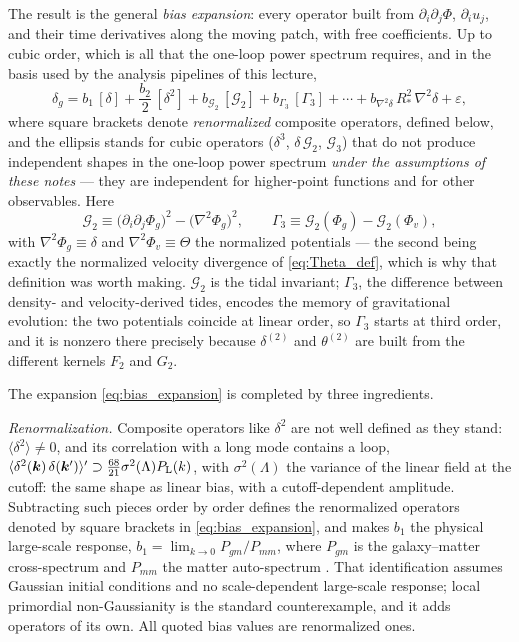 \documentclass[a4paper,11pt]{article}
\newcommand{\vk}{\bm{k}}
\def\Plin{P_{\rm L}}
\def\G{\mathcal{G}}
\numberwithin{equation}{section}
\begin{document}
The result is the general \emph{bias expansion}: every operator built from $\partial_i\partial_j\Phi$, $\partial_iu_j$, and their time derivatives along the moving patch, with free coefficients. Up to cubic order, which is all that the one-loop power spectrum requires, and in the basis used by the analysis pipelines of this lecture,
\begin{equation}
\boxed{\;
\delta_g = b_1\,[\delta]
+ \frac{b_2}{2}\,[\delta^2]
+ b_{\G_2}\,[\G_2]
+ b_{\Gamma_3}\,[\Gamma_3]
+ \cdots
+ b_{\nabla^2\delta}\,R_*^2\,\nabla^2\delta
+ \varepsilon ,\;}
\label{eq:bias_expansion}
\end{equation}
where square brackets denote \emph{renormalized} composite operators, defined below, and the ellipsis stands for cubic operators ($\delta^3$, $\delta\,\G_2$, $\G_3$) that do not produce independent shapes in the one-loop power spectrum \emph{under the assumptions of these notes} --- they are independent for higher-point functions and for other observables. Here
\begin{equation}
\G_2 \equiv \big(\partial_i\partial_j\Phi_g\big)^2 - \big(\nabla^2\Phi_g\big)^2 ,
\qquad
\Gamma_3 \equiv \G_2(\Phi_g) - \G_2(\Phi_v) ,
\label{eq:G2_Gamma3}
\end{equation}
with $\nabla^2\Phi_g \equiv \delta$ and $\nabla^2\Phi_v \equiv \Theta$ the normalized potentials --- the second being exactly the normalized velocity divergence of \eqref{eq:Theta_def}, which is why that definition was worth making. $\G_2$ is the tidal invariant; $\Gamma_3$, the difference between density- and velocity-derived tides, encodes the memory of gravitational evolution: the two potentials coincide at linear order, so $\Gamma_3$ starts at third order, and it is nonzero there precisely because $\delta^{(2)}$ and $\theta^{(2)}$ are built from the different kernels $F_2$ and $G_2$.

The expansion \eqref{eq:bias_expansion} is completed by three ingredients.

\emph{Renormalization.} Composite operators like $\delta^2$ are not well defined as they stand: $\langle\delta^2\rangle \ne 0$, and its correlation with a long mode contains a loop, $\langle\delta^2(\vk)\,\delta(\vk')\rangle' \supset \tfrac{68}{21}\sigma^2(\Lambda)\Plin(k)$, with $\sigma^2(\Lambda)$ the variance of the linear field at the cutoff: the same shape as linear bias, with a cutoff-dependent amplitude. Subtracting such pieces order by order defines the renormalized operators denoted by square brackets in \eqref{eq:bias_expansion}, and makes $b_1$ the physical large-scale response, $b_1 = \lim_{k\to0} P_{gm}/P_{mm}$, where $P_{gm}$ is the galaxy--matter cross-spectrum and $P_{mm}$ the matter auto-spectrum \cite[\S 2.10]{Desjacques2018}. That identification assumes Gaussian initial conditions and no scale-dependent large-scale response; local primordial non-Gaussianity is the standard counterexample, and it adds operators of its own. All quoted bias values are renormalized ones.
\end{document}
